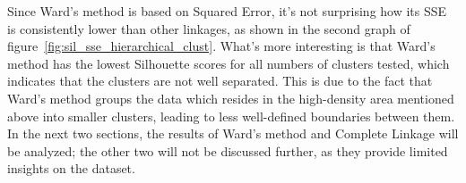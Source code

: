 Since Ward's method is based on Squared Error, it's not surprising how its SSE is consistently lower than other linkages, as shown in the second graph of figure~\ref{fig:sil_sse_hierarchical_clust}.
What's more interesting is that Ward's method has the lowest Silhouette scores for all numbers
of clusters tested, which indicates that the clusters are not well separated. This is due to
the fact that Ward's method groups the data which resides in the high-density area
mentioned above into smaller clusters, leading to less well-defined boundaries between them.
In the next two sections, the results of Ward's method and Complete Linkage will be analyzed;
the other two will not be discussed further, as they provide limited insights on the dataset.

